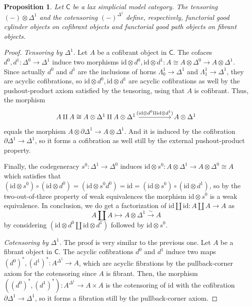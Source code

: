 \documentclass[a4paper,12pt]{amsart}
\theoremstyle{plain}
\newtheorem{proposition}[theorem]{Proposition}%
\theoremstyle{definition}
\theoremstyle{remark}
\begin{document}
\begin{proposition}\label{prop: goodpath}
Let $\mathsf{C}$ be a lax simplicial model category. The tensoring $(-)\otimes\Delta^1$ and the cotensoring $(-)^{\Delta^1}$ define, respectively, functorial good cylinder objects on cofibrant objects and functorial good path objects on fibrant objects.

\end{proposition}
\begin{proof}
\textit{Tensoring by $\Delta^1$.}
Let $A$ be a cofibrant object in $\mathsf{C}$. The cofaces $d^0,d^1:\Delta^0\rightarrow\Delta^1$ induce two morphisms $\mathrm{id}\otimes d^0,\mathrm{id}\otimes d^1:A \cong A \otimes \Delta^0\rightarrow A\otimes\Delta^1$. Since actually $d^0$ and $d^1$ are the inclusions of horns $\Lambda_0^1\rightarrow\Delta^1$ and $\Lambda_1^1\rightarrow\Delta^1$, they are acyclic cofibrations, so $\mathrm{id}\otimes d^0,\mathrm{id}\otimes d^1$ are acyclic cofibrations as well by the pushout-product axiom satisfied by the tensoring, using that $A$ is cofibrant. Thus, the morphism
\[
\begin{tikzcd}
A\amalg A \cong  A\otimes\Delta^1 \amalg A\otimes\Delta^1 \arrow[rr,"(\mathrm{id} \otimes d^0 \amalg \mathrm{id} \otimes d^1)"]
&
&A\otimes\Delta^1
\end{tikzcd}
\]
equals the morphism $A\otimes\partial\Delta^1\rightarrow A\otimes\Delta^1$. And it is induced by the cofibration $\partial\Delta^1\rightarrow\Delta^1$, so it forms a cofibration as well still by the external pushout-product property.


Finally, the codegeneracy $s^0:\Delta^1\rightarrow\Delta^0$ induces $\mathrm{id} \otimes s^0:A\otimes\Delta^1\rightarrow A\otimes\Delta^0 \cong A$ which satisfies that $(\mathrm{id} \otimes s^0)\circ (\mathrm{id} \otimes d^0) = (\mathrm{id}\otimes s^0d^0)= \mathrm{id} = (\mathrm{id} \otimes s^0)\circ (\mathrm{id} \otimes d^1)$, so by the two-out-of-three property of weak equivalences the morphism $\mathrm{id} \otimes s^0$ is a weak equivalence. In conclusion, we do get a factorization of $\mathrm{id} \amalg \mathrm{id}: A\amalg A\rightarrow A$ as
\[
A \amalg A \rightarrowtail A\otimes\Delta^1\stackrel{\sim}{\rightarrow} A
\]
by considering $(\mathrm{id} \otimes d^0 \amalg \mathrm{id} \otimes d^1)$ followed by $\mathrm{id} \otimes s^0$. 


\textit{Cotensoring by $\Delta^1$.} The proof is very similar to the previous one. Let $A$ be a fibrant object in $\mathsf{C}$. The acyclic cofibrations $d^0$ and $d^1$ induce two maps $(d^0)^*,(d^1)^*:A^{\Delta^1}\rightarrow A$, which are acyclic fibrations by the pullback-corner axiom for the cotensoring since $A$ is fibrant. Then, the morphism $((d^0)^*,(d^1)^*): A^{\Delta^1}\rightarrow A\times A$ is the cotensoring of $\mathrm{id}$ with the cofibration $\partial\Delta^1\rightarrow \Delta^1$, so it forms a fibration still  by the pullback-corner axiom.


\end{proof}
\end{document}
